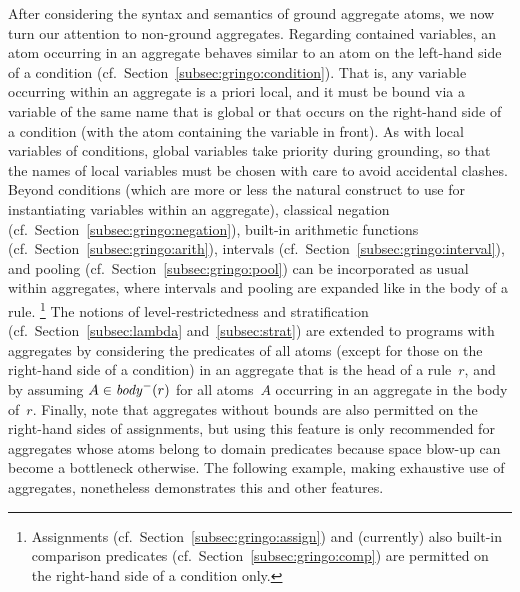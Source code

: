 After considering the syntax and semantics of ground aggregate atoms,
we now turn our attention to non-ground aggregates.
Regarding contained variables, an atom occurring in an aggregate behaves
similar to an atom on the left-hand side of a condition
(cf.\ Section~\ref{subsec:gringo:condition}).
That is, any variable occurring within an aggregate is a priori local,
and it must be bound via a variable of the same name that is global
or that occurs on the right-hand side of a condition
(with the atom containing the variable in front).
As with local variables of conditions, global variables take priority
during grounding, so that the names of local variables must be chosen
with care to avoid accidental clashes.
Beyond conditions (which are more or less the natural construct to use
for instantiating variables within an aggregate),
classical negation (cf.\ Section~\ref{subsec:gringo:negation}),
built-in arithmetic functions (cf.\ Section~\ref{subsec:gringo:arith}),
intervals (cf.\ Section~\ref{subsec:gringo:interval}), and 
pooling (cf.\ Section~\ref{subsec:gringo:pool})
can be incorporated as usual within aggregates,
where intervals and pooling are expanded like in the body of a rule.%
\footnote{%
  Assignments (cf.\ Section~\ref{subsec:gringo:assign}) and (currently)
  also built-in comparison predicates (cf.\ Section~\ref{subsec:gringo:comp})
  are permitted on the right-hand side of a condition only.}
The notions of level-restrictedness and stratification
(cf.\ Section~\ref{subsec:lambda} and~\ref{subsec:strat}) are extended
to programs with aggregates by
considering the predicates of all atoms (except for those on the right-hand side of a condition)
in an aggregate that is the head of a rule~$r$,
and by assuming $A\in\mathit{body}^-(r)$ for all atoms~$A$ occurring in an aggregate in the body of~$r$.
Finally, note that aggregates without bounds are also permitted on the
right-hand sides of assignments, but using this feature is only recommended
for aggregates whose atoms belong to domain predicates because space blow-up
can become a bottleneck otherwise.
The following example, making exhaustive use of aggregates,
nonetheless demonstrates this and other features.

